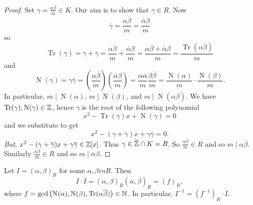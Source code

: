 \begin{proof}
	Set $\gamma = \frac{\alpha\overline\beta}{m} \in K$.
	Our aim is to show that $\gamma \in R$.
	Now 
	\[
		\overline\gamma 
		= \overline{\frac{\alpha\overline\beta}{m}}
		= \frac{\overline\alpha\beta}{m}
	\]
	so
	\[
		\operatorname{Tr}(\gamma)
		= \gamma + \overline\gamma
		= \frac{\alpha\overline\beta}{m}
			+ \frac{\overline\alpha\beta}{m}
		= \frac{\alpha\overline\beta + \overline\alpha\beta}{m}
		= \frac{\operatorname{Tr}(\alpha\overline\beta)}{m} 
	\]
	and
	\[
		\operatorname{N}(\gamma)
		= \gamma\overline\gamma
		= \left( \frac{\alpha\overline\beta}m \right)
			\left( \frac{\overline\alpha\beta}m \right)
		= \frac{\alpha\overline\alpha}{m} \frac{\beta\overline\beta}{m}
		= \frac{\operatorname{N}(\alpha)}{m} \cdot
			\frac{\operatorname{N}(\beta)}{m}.
	\]
	In particular,
	$m \mid \operatorname{N}(\alpha)$, $m \mid \operatorname{N}(\beta)$,
	and
	$m \mid \operatorname{N}(\alpha\overline\beta)$.
	We have $\operatorname{Tr}(\gamma), \operatorname{N}(\gamma) \in \mathbb{Z}$,
	hence $\gamma$ is the root of the following polynomial
	\[
		x^2 - \operatorname{Tr}(\gamma) x + \operatorname{N}(\gamma) = 0
	\]
	and we substitute to get
	\[
		x^2 - (\gamma + \overline\gamma) x + \gamma\overline\gamma = 0.
	\]
	\emph{But}, 
	$x^2 - (\gamma + \overline\gamma)x + \gamma\overline\gamma \in \mathbb{Z}[x]$.
	Thus $\gamma \in \overline{\mathbb{Z}} \cap K = R$.
	So $\frac{\alpha\overline\beta}m \in R$ and so 
	$m \mid \alpha\overline\beta$.
	Similarly $\frac{\overline \alpha \beta}m \in R$ and so
	$m \mid \overline\alpha \beta$.
\end{proof}

\begin{proposition}[]
	Let $I = (\alpha, \beta)_R$ for some $\alpha, \beta in R$.
	Then
	\[
		I \cdot \overline I 
		= (\alpha, \beta)_R (\overline\alpha, \overline\beta)_R
		= (f)_R,
	\]
	where $f = \operatorname{gcd}\left(
		\operatorname{N}(\alpha),
		\operatorname{N}(\beta),
		\operatorname{Tr}(\alpha\overline\beta)
	\right) \in \mathbb{N}$.
	In particular, $I^{-1} = (f^{-1})_R \cdot \overline I$.
\end{proposition}

